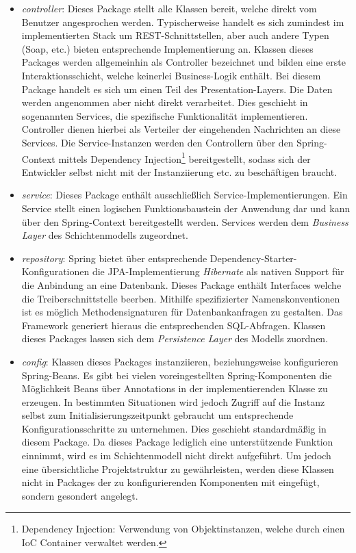 \begin{itemize}
  \item \emph{controller}: Dieses Package stellt alle Klassen bereit, welche direkt vom Benutzer angesprochen werden. Typischerweise handelt es sich zumindest im implementierten Stack um REST-Schnittstellen, aber auch andere Typen (Soap, etc.) bieten entsprechende Implementierung an. Klassen dieses Packages werden allgemeinhin als Controller bezeichnet und bilden eine erste Interaktionsschicht, welche keinerlei Business-Logik enthält. Bei diesem Package handelt es sich um einen Teil des Presentation-Layers. Die Daten werden angenommen aber nicht direkt verarbeitet. Dies geschieht in sogenannten Services, die spezifische Funktionalität implementieren. Controller dienen hierbei als Verteiler der eingehenden Nachrichten an diese Services. Die Service-Instanzen werden den Controllern über den Spring-Context mittels Dependency Injection\footnote{Dependency Injection: Verwendung von Objektinstanzen, welche durch einen IoC Container verwaltet werden.} bereitgestellt, sodass sich der Entwickler selbst nicht mit der Instanziierung etc. zu beschäftigen braucht. 

  \item \emph{service}: Dieses Package enthält ausschließlich Service-Implementierungen. Ein Service stellt einen logischen Funktionsbaustein der Anwendung dar und kann über den Spring-Context bereitgestellt werden. Services werden dem \emph{Business Layer} des Schichtenmodells zugeordnet.

  \item \emph{repository}: Spring bietet über entsprechende Dependency-Starter-Konfigurationen die JPA-Implementierung \emph{Hibernate} als nativen Support für die Anbindung an eine Datenbank. Dieses Package enthält Interfaces welche die Treiberschnittstelle beerben. Mithilfe spezifizierter Namenskonventionen ist es möglich Methodensignaturen für Datenbankanfragen zu gestalten. Das Framework generiert hieraus die entsprechenden SQL-Abfragen. Klassen dieses Packages lassen sich dem \emph{Persistence Layer} des Modells zuordnen.

  \item \emph{config}: Klassen dieses Packages instanziieren, beziehungsweise konfigurieren Spring-Beans. Es gibt bei vielen voreingestellten Spring-Komponenten die Möglichkeit Beans über Annotations in der implementierenden Klasse zu erzeugen. In bestimmten Situationen wird jedoch Zugriff auf die Instanz selbst zum Initialisierungszeitpunkt gebraucht um entsprechende Konfigurationsschritte zu unternehmen. Dies geschieht standardmäßig in diesem Package. Da dieses Package lediglich eine unterstützende Funktion einnimmt, wird es im Schichtenmodell nicht direkt aufgeführt. Um jedoch eine übersichtliche Projektstruktur zu gewährleisten, werden diese Klassen nicht in Packages der zu konfigurierenden Komponenten mit eingefügt, sondern gesondert angelegt.


\end{itemize}

